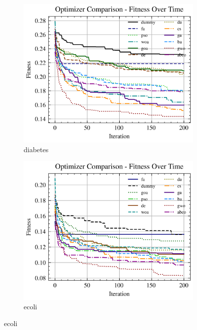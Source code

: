 \begin{figure}[htp]
\begin{subfigure}[htp]{0.45\textwidth}
    \end{subfigure}
    \begin{subfigure}[htp]{0.45\textwidth}
        \includegraphics[width=\textwidth]{imagenes/fitness_charts/img/real/diabetes/optimizers_fitness_svc.png}
        \caption{diabetes}
    \end{subfigure}
    \begin{subfigure}[htp]{0.45\textwidth}
        \includegraphics[width=\textwidth]{imagenes/fitness_charts/img/real/ecoli/optimizers_fitness_svc.png}
        \caption{ecoli}
    \end{subfigure}

\end{figure}
